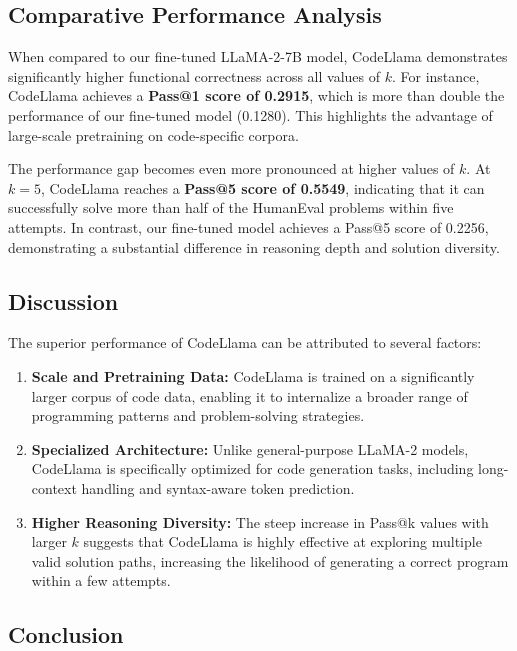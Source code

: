 \subsection{Comparative Performance Analysis}

When compared to our fine-tuned LLaMA-2-7B model, CodeLlama demonstrates significantly higher functional correctness across all values of $k$. For instance, CodeLlama achieves a \textbf{Pass@1 score of 0.2915}, which is more than double the performance of our fine-tuned model (0.1280). This highlights the advantage of large-scale pretraining on code-specific corpora.

The performance gap becomes even more pronounced at higher values of $k$. At $k=5$, CodeLlama reaches a \textbf{Pass@5 score of 0.5549}, indicating that it can successfully solve more than half of the HumanEval problems within five attempts. In contrast, our fine-tuned model achieves a Pass@5 score of 0.2256, demonstrating a substantial difference in reasoning depth and solution diversity.

\subsection{Discussion}

The superior performance of CodeLlama can be attributed to several factors:

\begin{enumerate}
    \item \textbf{Scale and Pretraining Data:} CodeLlama is trained on a significantly larger corpus of code data, enabling it to internalize a broader range of programming patterns and problem-solving strategies.
    
    \item \textbf{Specialized Architecture:} Unlike general-purpose LLaMA-2 models, CodeLlama is specifically optimized for code generation tasks, including long-context handling and syntax-aware token prediction.
    
    \item \textbf{Higher Reasoning Diversity:} The steep increase in Pass@k values with larger $k$ suggests that CodeLlama is highly effective at exploring multiple valid solution paths, increasing the likelihood of generating a correct program within a few attempts.
\end{enumerate}

\subsection{Conclusion}

